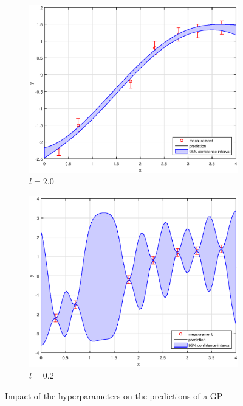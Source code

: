 \begin{figure}[t]
	\begin{subfigure}[b]{0.49\textwidth}
		\includegraphics[width=\textwidth]{../Figures/long.eps}
		\caption{$l = 2.0$}
		\label{fig:exl3}
	\end{subfigure}
	\hfill
	\begin{subfigure}[b]{0.49\textwidth}
		\includegraphics[width=\textwidth]{../Figures/short.eps}
		\caption{$l = 0.2$}
		\label{fig:exl4}
	\end{subfigure}
\caption{Impact of the hyperparameters on the predictions of a GP}
\label{fig:impact_lengthscale}
\end{figure}

